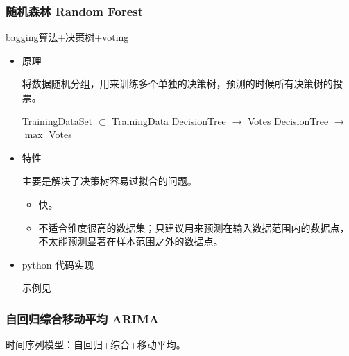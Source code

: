 \documentclass{article}
\begin{document}
\subsubsection{随机森林 Random Forest}

bagging算法+决策树+voting

\begin{itemize}

\item{原理}

将数据随机分组，用来训练多个单独的决策树，预测的时候所有决策树的投票。

\begin{algorithmic}
        \State TrainingDataSet $\subset$ TrainingData
        \State DecisionTree $\rightarrow$ 
    \EndFor
\EndProcedure
{}
    \State Votes
        \State DecisionTree $\rightarrow$ 
    \EndFor
    \Return $\max$ Votes
\EndProcedure
\end{algorithmic}

\item{特性}

主要是解决了决策树容易过拟合的问题。

\begin{itemize}
    \item  快。
    \item  不适合维度很高的数据集；只建议用来预测在输入数据范围内的数据点，不太能预测显著在样本范围之外的数据点。
\end{itemize}

\item{python 代码实现}

示例见

\end{itemize}

\subsubsection{自回归综合移动平均 ARIMA}

时间序列模型：自回归+综合+移动平均。
\end{document}
